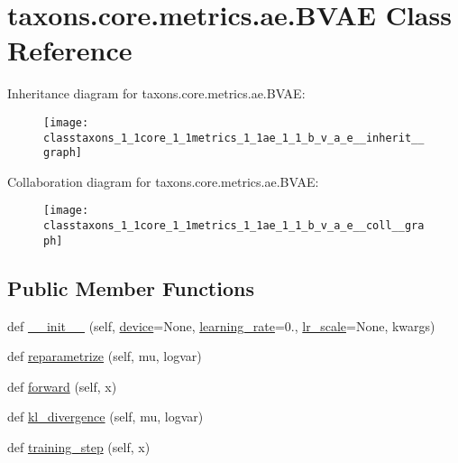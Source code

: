 \hypertarget{classtaxons_1_1core_1_1metrics_1_1ae_1_1_b_v_a_e}{}\section{taxons.\+core.\+metrics.\+ae.\+B\+V\+AE Class Reference}
\label{classtaxons_1_1core_1_1metrics_1_1ae_1_1_b_v_a_e}


Inheritance diagram for taxons.\+core.\+metrics.\+ae.\+B\+V\+AE\+:
\nopagebreak
\begin{figure}[H]
\begin{center}
\leavevmode
\texttt{[image: classtaxons\_1\_1core\_1\_1metrics\_1\_1ae\_1\_1\_b\_v\_a\_e\_\_inherit\_\_graph]}
\end{center}
\end{figure}


Collaboration diagram for taxons.\+core.\+metrics.\+ae.\+B\+V\+AE\+:
\nopagebreak
\begin{figure}[H]
\begin{center}
\leavevmode
\texttt{[image: classtaxons\_1\_1core\_1\_1metrics\_1\_1ae\_1\_1\_b\_v\_a\_e\_\_coll\_\_graph]}
\end{center}
\end{figure}
\subsection*{Public Member Functions}
\begin{DoxyCompactItemize}
\item 
def \hyperlink{classtaxons_1_1core_1_1metrics_1_1ae_1_1_b_v_a_e_a4d51e23a0e6d7c5bec993a72da579102}{\+\_\+\+\_\+init\+\_\+\+\_\+} (self, \hyperlink{classtaxons_1_1core_1_1metrics_1_1ae_1_1_base_a_e_a0918ab6177121c975f5477529c228968}{device}=None, \hyperlink{classtaxons_1_1core_1_1metrics_1_1ae_1_1_base_a_e_a60c6445fef7c1ca698e195f877bfbba5}{learning\+\_\+rate}=0., \hyperlink{classtaxons_1_1core_1_1metrics_1_1ae_1_1_base_a_e_a04b605a2cfadf2715f833bce1260f77c}{lr\+\_\+scale}=None, kwargs)
\item 
def \hyperlink{classtaxons_1_1core_1_1metrics_1_1ae_1_1_b_v_a_e_ab5a3f2868a56a149c9408e76f05f0bd6}{reparametrize} (self, mu, logvar)
\item 
def \hyperlink{classtaxons_1_1core_1_1metrics_1_1ae_1_1_b_v_a_e_afa7d811264780fd66903b562eee6dae1}{forward} (self, x)
\item 
def \hyperlink{classtaxons_1_1core_1_1metrics_1_1ae_1_1_b_v_a_e_a123bca1318a2d98864f216bbe59fa937}{kl\+\_\+divergence} (self, mu, logvar)
\item 
def \hyperlink{classtaxons_1_1core_1_1metrics_1_1ae_1_1_b_v_a_e_a2041b1ff428ecd22fd43c7dc2b2496fe}{training\+\_\+step} (self, x)
\end{DoxyCompactItemize}
